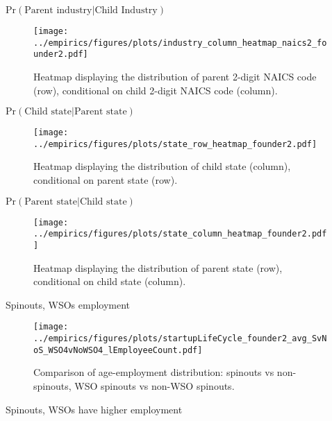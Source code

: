 \documentclass[english,usenames,dvipsnames]{beamer}
\begin{document}
\begin{frame}{$\mathrm{Pr}(\textrm{Parent industry} | \textrm{Child Industry})$}
\begin{figure}
	\texttt{[image: ../empirics/figures/plots/industry\_column\_heatmap\_naics2\_founder2.pdf]}
	\caption{\footnotesize Heatmap displaying the distribution of parent 2-digit NAICS code (row), conditional on child 2-digit NAICS code (column).}
\end{figure}
\end{frame}

\begin{frame}{$\mathrm{Pr}(\textrm{Child state} | \textrm{Parent state})$}
\begin{figure}
	\texttt{[image: ../empirics/figures/plots/state\_row\_heatmap\_founder2.pdf]}
	\caption{\footnotesize Heatmap displaying the distribution of child state (column), conditional on parent state (row).}
\end{figure}
\end{frame}

\begin{frame}{$\mathrm{Pr}(\textrm{Parent state} | \textrm{Child state})$}
\begin{figure}
\texttt{[image: ../empirics/figures/plots/state\_column\_heatmap\_founder2.pdf]}
\caption{\footnotesize Heatmap displaying the distribution of parent state (row), conditional on child state (column).}
\end{figure}
\end{frame}

\begin{frame}{Spinouts, WSOs employment}
	\begin{figure}
		\centering
		\texttt{[image: ../empirics/figures/plots/startupLifeCycle\_founder2\_avg\_SvNoS\_WSO4vNoWSO4\_lEmployeeCount.pdf]}
		\caption{Comparison of age-employment distribution: spinouts vs non-spinouts, WSO spinouts vs non-WSO spinouts.}
	\end{figure}
\end{frame}

\begin{frame}{Spinouts, WSOs have higher employment}
	\begin{table}
		\tiny
		\centering
		
		\caption{\footnotesize The regresssions above compare \textbf{employment} in WSO4 spinouts, non-WSO4 spinouts and non-spinouts. The first regression uses no controls. The following three regressions in addition control for year effects, age effects, and / or cohort effects, in each case allowing the relevant effect to differ by State-NAICS4 combination. Standard errors are multi-way clustered at the state, NAICS4 and year levels.}
	\end{table}
\end{frame}
\end{document}
